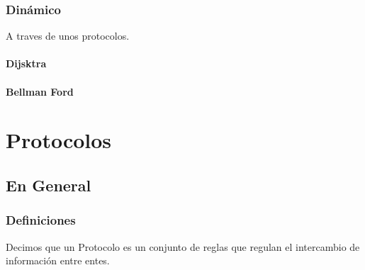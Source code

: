 \documentclass[12pt, fleqn]{report}                             %
\theoremstyle{break}                                            %
\begin{document}
            \section{Dinámico}
            A traves de unos protocolos.


                \subsection{Dijsktra}
                \subsection{Bellman Ford}


            









\part{Protocolos}
\clearpage

    \chapter{En General}

        \clearpage
        \section{Definiciones}

            Decimos que un Protocolo es un conjunto de reglas que regulan el intercambio de
            información entre entes.
\end{document}
